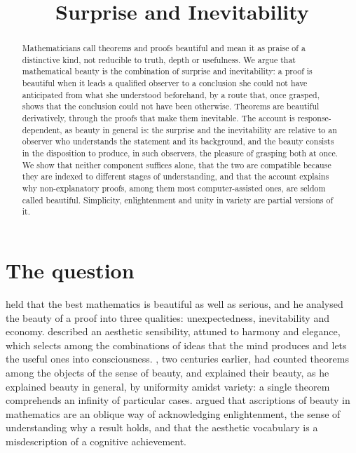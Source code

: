 \documentclass{situationist-preprint}
\title{Surprise and Inevitability}
\begin{document}
\maketitle

\begin{abstract}
Mathematicians call theorems and proofs beautiful and mean it as praise of a distinctive kind, not reducible to truth, depth or usefulness. We argue that mathematical beauty is the combination of surprise and inevitability: a proof is beautiful when it leads a qualified observer to a conclusion she could not have anticipated from what she understood beforehand, by a route that, once grasped, shows that the conclusion could not have been otherwise. Theorems are beautiful derivatively, through the proofs that make them inevitable. The account is response-dependent, as beauty in general is: the surprise and the inevitability are relative to an observer who understands the statement and its background, and the beauty consists in the disposition to produce, in such observers, the pleasure of grasping both at once. We show that neither component suffices alone, that the two are compatible because they are indexed to different stages of understanding, and that the account explains why non-explanatory proofs, among them most computer-assisted ones, are seldom called beautiful. Simplicity, enlightenment and unity in variety are partial versions of it.
\end{abstract}

\section{The question}

\citet{Hardy1940} held that the best mathematics is beautiful as well as serious, and he analysed the beauty of a proof into three qualities: unexpectedness, inevitability and economy. \citet{Poincare1908} described an aesthetic sensibility, attuned to harmony and elegance, which selects among the combinations of ideas that the mind produces and lets the useful ones into consciousness. \citet{Hutcheson1725}, two centuries earlier, had counted theorems among the objects of the sense of beauty, and explained their beauty, as he explained beauty in general, by uniformity amidst variety: a single theorem comprehends an infinity of particular cases. \citet{Rota1997} argued that ascriptions of beauty in mathematics are an oblique way of acknowledging enlightenment, the sense of understanding why a result holds, and that the aesthetic vocabulary is a misdescription of a cognitive achievement.
\end{document}
